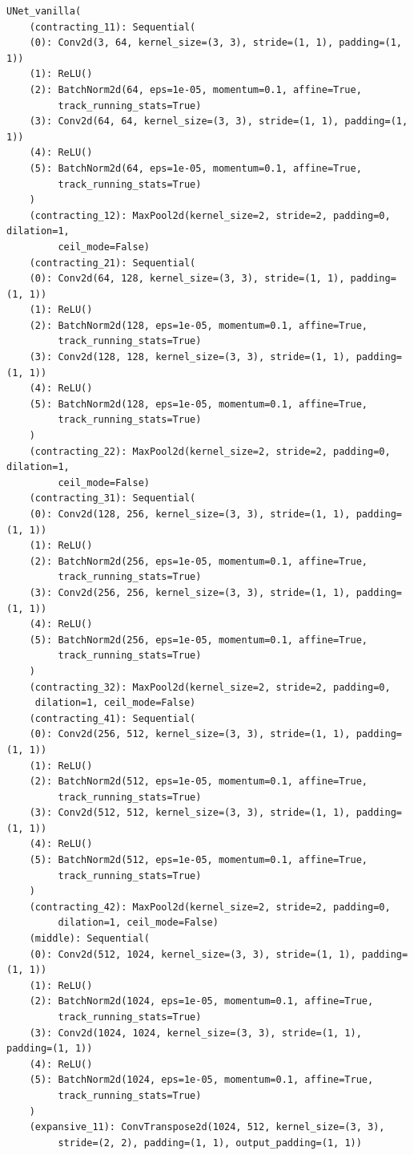	\begin{lstlisting}[caption={Unet Vanilla model architecture description},label=lst:unetbaseline]
	UNet_vanilla(
	(contracting_11): Sequential(
	(0): Conv2d(3, 64, kernel_size=(3, 3), stride=(1, 1), padding=(1, 1))
	(1): ReLU()
	(2): BatchNorm2d(64, eps=1e-05, momentum=0.1, affine=True, 
		 track_running_stats=True)
	(3): Conv2d(64, 64, kernel_size=(3, 3), stride=(1, 1), padding=(1, 1))
	(4): ReLU()
	(5): BatchNorm2d(64, eps=1e-05, momentum=0.1, affine=True, 
	     track_running_stats=True)
	)
	(contracting_12): MaxPool2d(kernel_size=2, stride=2, padding=0, dilation=1, 
	     ceil_mode=False)
	(contracting_21): Sequential(
	(0): Conv2d(64, 128, kernel_size=(3, 3), stride=(1, 1), padding=(1, 1))
	(1): ReLU()
	(2): BatchNorm2d(128, eps=1e-05, momentum=0.1, affine=True, 
	     track_running_stats=True)
	(3): Conv2d(128, 128, kernel_size=(3, 3), stride=(1, 1), padding=(1, 1))
	(4): ReLU()
	(5): BatchNorm2d(128, eps=1e-05, momentum=0.1, affine=True, 
	     track_running_stats=True)
	)
	(contracting_22): MaxPool2d(kernel_size=2, stride=2, padding=0, dilation=1, 
	     ceil_mode=False)
	(contracting_31): Sequential(
	(0): Conv2d(128, 256, kernel_size=(3, 3), stride=(1, 1), padding=(1, 1))
	(1): ReLU()
	(2): BatchNorm2d(256, eps=1e-05, momentum=0.1, affine=True, 
	     track_running_stats=True)
	(3): Conv2d(256, 256, kernel_size=(3, 3), stride=(1, 1), padding=(1, 1))
	(4): ReLU()
	(5): BatchNorm2d(256, eps=1e-05, momentum=0.1, affine=True, 
	     track_running_stats=True)
	)
	(contracting_32): MaxPool2d(kernel_size=2, stride=2, padding=0, 
	 dilation=1, ceil_mode=False)
	(contracting_41): Sequential(
	(0): Conv2d(256, 512, kernel_size=(3, 3), stride=(1, 1), padding=(1, 1))
	(1): ReLU()
	(2): BatchNorm2d(512, eps=1e-05, momentum=0.1, affine=True, 
	     track_running_stats=True)
	(3): Conv2d(512, 512, kernel_size=(3, 3), stride=(1, 1), padding=(1, 1))
	(4): ReLU()
	(5): BatchNorm2d(512, eps=1e-05, momentum=0.1, affine=True, 
	     track_running_stats=True)
	)
	(contracting_42): MaxPool2d(kernel_size=2, stride=2, padding=0, 
	     dilation=1, ceil_mode=False)
	(middle): Sequential(
	(0): Conv2d(512, 1024, kernel_size=(3, 3), stride=(1, 1), padding=(1, 1))
	(1): ReLU()
	(2): BatchNorm2d(1024, eps=1e-05, momentum=0.1, affine=True, 
	     track_running_stats=True)
	(3): Conv2d(1024, 1024, kernel_size=(3, 3), stride=(1, 1), padding=(1, 1))
	(4): ReLU()
	(5): BatchNorm2d(1024, eps=1e-05, momentum=0.1, affine=True, 
	     track_running_stats=True)
	)
	(expansive_11): ConvTranspose2d(1024, 512, kernel_size=(3, 3), 
	     stride=(2, 2), padding=(1, 1), output_padding=(1, 1))

\end{lstlisting}
